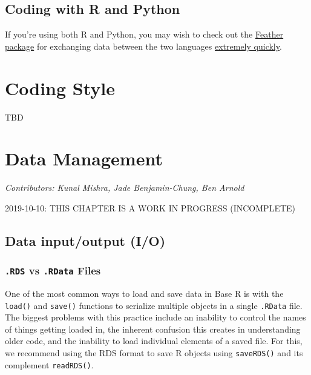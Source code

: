 \documentclass[]{book}
\begin{document}
\hypertarget{coding-with-r-and-python}{%
\section{Coding with R and Python}\label{coding-with-r-and-python}}

If you're using both R and Python, you may wish to check out the \href{https://www.rdocumentation.org/packages/feather/versions/0.3.3}{Feather package} for exchanging data between the two languages \href{https://blog.rstudio.com/2016/03/29/feather/}{extremely quickly}.

\hypertarget{codingstyle}{%
\chapter{Coding Style}\label{codingstyle}}

TBD

\hypertarget{datamanagement}{%
\chapter{Data Management}\label{datamanagement}}

\emph{Contributors: Kunal Mishra, Jade Benjamin-Chung, Ben Arnold}

2019-10-10: THIS CHAPTER IS A WORK IN PROGRESS (INCOMPLETE)

\hypertarget{data-inputoutput-io}{%
\section{Data input/output (I/O)}\label{data-inputoutput-io}}

\hypertarget{rds-vs-.rdata-files}{%
\subsection{\texorpdfstring{\texttt{.RDS} vs \texttt{.RData} Files}{.RDS vs .RData Files}}\label{rds-vs-.rdata-files}}

One of the most common ways to load and save data in Base R is with the \texttt{load()} and \texttt{save()} functions to serialize multiple objects in a single \texttt{.RData} file. The biggest problems with this practice include an inability to control the names of things getting loaded in, the inherent confusion this creates in understanding older code, and the inability to load individual elements of a saved file. For this, we recommend using the RDS format to save R objects using \texttt{saveRDS()} and its complement \texttt{readRDS()}.
\end{document}
